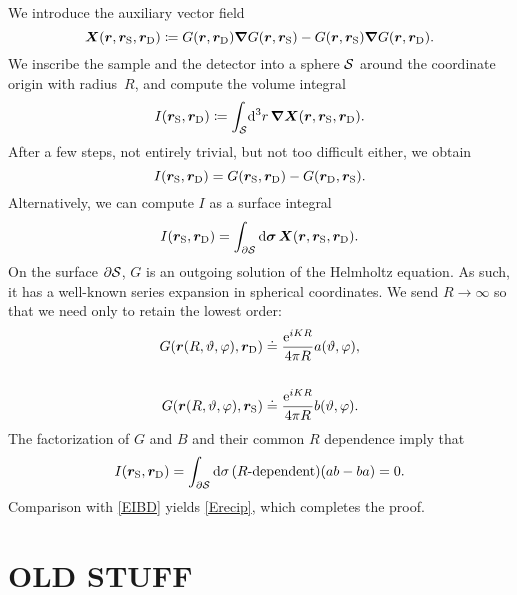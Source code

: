 We introduce the auxiliary vector field
\begin{equation}
  \bm{X}(\bm{r},\bm{r}_\text{S},\bm{r}_\text{D})\coloneqq G(\bm{r},\bm{r}_\text{D})\bm{\nabla} G(\bm{r},\bm{r}_\text{S}) - G(\bm{r},\bm{r}_\text{S})\bm{\nabla} G(\bm{r},\bm{r}_\text{D}).
\end{equation}
We inscribe the sample and the detector
into a sphere $\mathcal{S}$ around the coordinate origin with radius~$R$,
and compute the volume integral
\begin{equation}\label{Eprerecipro}
    I(\rS,\rD) \coloneqq \displaystyle\int_\Sphere\!\d^3r\,\Nabla \v{X}(\r,\rS,\rD).
\end{equation}
After a few steps, not entirely trivial, but not too difficult either,
we obtain
\begin{equation}\label{EIBD}
  I(\rS,\rD) = G(\rS,\rD) - G(\rD,\rS).
\end{equation}
Alternatively, we can compute $I$ as a surface integral
\begin{equation}
  I(\bm{r}_\text{S},\bm{r}_\text{D})
  =\displaystyle\int_{\partial\mathcal{S}}\mathrm d\bm{\sigma}\,\bm{X}(\bm{r},\bm{r}_\text{S},\bm{r}_\text{D}).
\end{equation}
On the surface $\partial\mathcal{S}$,
$G$ is an outgoing solution of the Helmholtz equation.
As such, it has a well-known series expansion in spherical coordinates.
We send $R\to\infty$ so that we need only to retain the lowest order:
\begin{align}
   G(\bm{r}(R,\vartheta,\varphi),\bm{r}_\text{D})
   &\doteq\displaystyle \frac{\mathrm e^{iKR}}{4\pi R} a(\vartheta,\varphi),
   \\[3.8ex]
   G(\bm{r}(R,\vartheta,\varphi),\bm{r}_\text{S})
   &\doteq\displaystyle \frac{\mathrm e^{iKR}}{4\pi R} b(\vartheta,\varphi).
\end{align}
The factorization of $G$ and $B$ and their common $R$ dependence imply that
\begin{equation}
  I(\bm{r}_\text{S},\bm{r}_\text{D})
  =\displaystyle\int_{\partial\mathcal{S}}\mathrm d\sigma\,
       (\text{$R$-dependent})(ab-ba)
  = 0.
\end{equation}
Comparison with \cref{EIBD} yields \cref{Erecip},
which completes the proof.

%
%


\section*{OLD STUFF}

